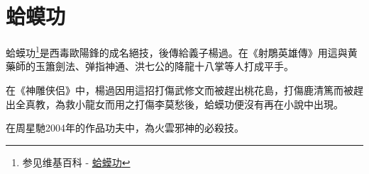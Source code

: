 \chapter{蛤蟆功}
蛤蟆功\footnote{参见维基百科 - \href{http://zh.wikipedia.org/wiki/\%E8\%9B\%A4\%E8\%9F\%86\%E5\%8A\%9F}{蛤蟆功}}是西毒歐陽鋒的成名絕技，後傳給義子楊過。在《射鵰英雄傳》用這與黄藥師的玉簫劍法、弹指神通、洪七公的降龍十八掌等人打成平手。

在《神雕侠侣》中，楊過因用這招打傷武修文而被趕出桃花島，打傷鹿清篤而被趕出全真教，為救小龍女而用之打傷李莫愁後，蛤蟆功便沒有再在小說中出現。

在周星馳2004年的作品功夫中，為火雲邪神的必殺技。

